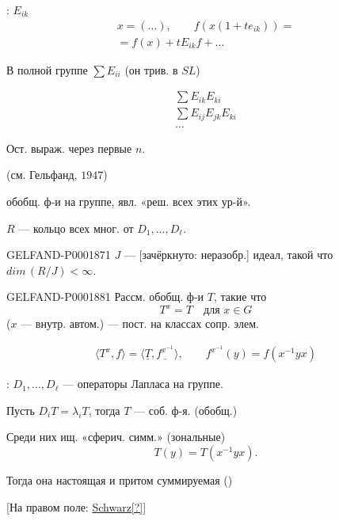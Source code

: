 : $E_{ik}$
\begin{gather*}
x=(\ldots),\qquad f(x(1+te_{ik}))={}\\
{}=f(x)+tE_{ik}f+\ldots
\end{gather*}

В полной группе $\sum E_{ii}$ (он трив. в $SL$)

\begin{gather*}
\sum E_{ik}E_{ki}\\
\sum E_{ij}E_{jk}E_{ki}\\
\ldots
\end{gather*}

Ост. выраж. через первые $n$.

(см. Гельфанд, \underline{$1947$})

  обобщ. ф-и на группе, явл. «реш. всех этих ур-й».

$R$ — кольцо всех мног. от $D_1,\ldots,D_\ell$.

\begin{GelfandAdjacentEvidence}{GELFAND-P000187}{1}
$J$ — [зачёркнуто: неразобр.] идеал, такой что $dim\,(R/J)<\infty$.
\end{GelfandAdjacentEvidence}




\begin{GelfandAdjacentEvidence}{GELFAND-P000188}{1}
Рассм. обобщ. ф-и $T$, такие что
\begin{equation*}T^x=T\quad\text{для }x\in G\end{equation*}
($x$ — внутр. автом.) — пост. на классах сопр. элем.

\begin{gather*}
\langle T^x,f\rangle=\langle\underline{T},\underline{f^{x^{-1}}}\rangle,\qquad
f^{x^{-1}}(y)=f(x^{-1}yx)
\end{gather*}

: $D_1,\ldots,D_\ell$ — операторы Лапласа на группе.

Пусть $D_iT=\lambda_iT$, тогда $T$ — соб. ф-я. (обобщ.)

Среди них ищ. «сферич. симм.» (зональные)
\begin{equation*}T(y)=T(x^{-1}yx).\end{equation*}

Тогда она настоящая и притом суммируемая ()

[На правом поле: \underline{Schwarz[?]}]
\end{GelfandAdjacentEvidence}

